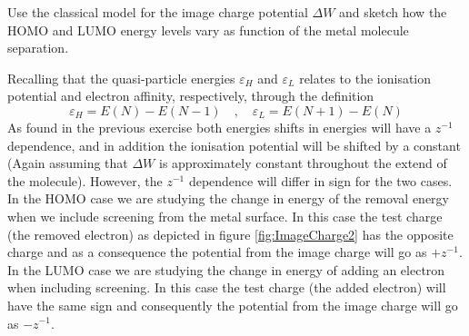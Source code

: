 \begin{exercise}
Use the classical model for the image charge potential $\Delta W$ and sketch how the HOMO and LUMO energy levels vary as function of the metal molecule separation.
\end{exercise}
\begin{solution}
Recalling that the quasi-particle energies $\varepsilon_H$ and $\varepsilon_L$ relates to the ionisation potential and electron affinity, respectively, through the definition
\begin{equation}
    \varepsilon_H = E(N) - E(N-1) \quad , \quad \varepsilon_L = E(N+1) - E(N)
\end{equation}
As found in the previous exercise both energies shifts in energies will have a $z^{-1}$ dependence, and in addition the ionisation potential will be shifted by a constant (Again assuming that $\Delta W$ is approximately constant throughout the extend of the molecule). However, the $z^{-1}$ dependence will differ in sign for the two cases. \\
In the HOMO case we are studying the change in energy of the removal energy when we include screening from the metal surface. In this case the test charge (the removed electron) as depicted in figure \ref{fig:ImageCharge2} has the opposite charge and as a consequence the potential from the image charge will go as $+z^{-1}$. \\
In the LUMO case we are studying the change in energy of adding an electron when including screening. In this case the test charge (the added electron) will have the same sign and consequently the potential from the image charge will go as $-z^{-1}$.
\begin{figure}[b!]
    \centering
\end{figure}
\end{solution}
